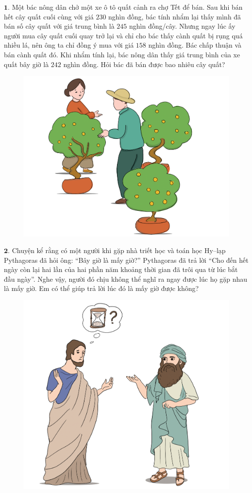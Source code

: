 \begin{multicols}{2}
	$\pmb{1.}$ Một bác nông dân chở một xe ô tô quất cảnh ra chợ Tết để bán. Sau khi bán hết cây quất cuối cùng với giá $230$ nghìn đồng, bác tính nhẩm lại thấy mình đã bán số cây quất với giá trung bình là $245$ nghìn đồng/cây. Nhưng ngay lúc ấy người mua cây quất cuối quay trở lại và chỉ cho bác thấy cành quất bị rụng quá nhiều lá, nên ông ta chỉ đồng ý mua với giá $158$ nghìn đồng. Bác chấp thuận và bán cành quất đó. Khi nhẩm tính lại, bác nông dân thấy giá trung bình của xe quất bây giờ là $242$ nghìn đồng. Hỏi bác đã bán được bao nhiêu cây quất?
	\begin{figure}[H]
		\centering
		\vspace*{-10pt}
		\captionsetup{labelformat= empty, justification=centering}
		\includegraphics[width=0.8\linewidth]{Pi1_2_Bai1}
		\vspace*{-10pt}
	\end{figure}
	$\pmb{2.}$ Chuyện kể rằng có một người khi gặp nhà triết học và toán học Hy--lạp Pythagoras đã hỏi ông: “Bây giờ là mấy giờ?” Pythagoras đã trả lời “Cho đến hết ngày còn lại hai lần của hai phần năm khoảng thời gian đã trôi qua từ lúc bắt đầu ngày”. Nghe vậy, người đó chịu không thể nghĩ ra ngay được lúc họ gặp nhau là mấy giờ. Em có thể giúp trả lời lúc đó là mấy giờ được không?
	\begin{figure}[H]
		\centering
		\vspace*{-10pt}
		\captionsetup{labelformat= empty, justification=centering}
		\includegraphics[width=0.7\linewidth]{Pi1_2_Bai2}

\end{figure}
\end{multicols}
